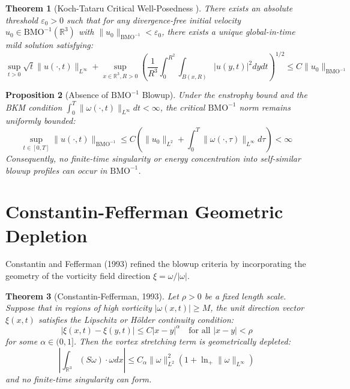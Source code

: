 \documentclass[11pt,a4paper]{article}
\newtheorem{theorem}{Theorem}[section]
\newtheorem{proposition}[theorem]{Proposition}
\theoremstyle{definition}
\begin{document}
\begin{theorem}[Koch-Tataru Critical Well-Posedness \cite{kochtataru2001}]
There exists an absolute threshold $\varepsilon_0 > 0$ such that for any divergence-free initial velocity $u_0 \in \mathrm{BMO}^{-1}(\mathbb{R}^3)$ with $\|u_0\|_{\mathrm{BMO}^{-1}} < \varepsilon_0$, there exists a unique global-in-time mild solution satisfying:
\begin{equation}
\sup_{t > 0} \sqrt{t} \|u(\cdot, t)\|_{L^\infty} + \sup_{x \in \mathbb{R}^3, R > 0} \left( \frac{1}{R^3} \int_0^{R^2} \int_{B(x, R)} |u(y, t)|^2 dy dt \right)^{1/2} \le C \|u_0\|_{\mathrm{BMO}^{-1}}
\end{equation}
\end{theorem}

\begin{proposition}[Absence of $\mathrm{BMO}^{-1}$ Blowup]
Under the enstrophy bound and the BKM condition $\int_0^T \|\omega(\cdot, t)\|_{L^\infty} dt < \infty$, the critical $\mathrm{BMO}^{-1}$ norm remains uniformly bounded:
\begin{equation}
\sup_{t \in [0, T]} \|u(\cdot, t)\|_{\mathrm{BMO}^{-1}} \le C \left( \|u_0\|_{L^2} + \int_0^T \|\omega(\cdot, \tau)\|_{L^\infty} d\tau \right) < \infty
\end{equation}
Consequently, no finite-time singularity or energy concentration into self-similar blowup profiles can occur in $\mathrm{BMO}^{-1}$.
\end{proposition}

\section{Constantin-Fefferman Geometric Depletion}
Constantin and Fefferman (1993) refined the blowup criteria by incorporating the geometry of the vorticity field direction $\xi = \omega / |\omega|$.

\begin{theorem}[Constantin-Fefferman, 1993]
Let $\rho > 0$ be a fixed length scale. Suppose that in regions of high vorticity $|\omega(x,t)| \ge M$, the unit direction vector $\xi(x,t)$ satisfies the Lipschitz or Hölder continuity condition:
\begin{equation}
|\xi(x,t) - \xi(y,t)| \le C |x-y|^\alpha \quad \text{for all } |x-y| < \rho
\end{equation}
for some $\alpha \in (0, 1]$. Then the vortex stretching term is geometrically depleted:
\begin{equation}
\left| \int_{\mathbb{R}^3} (S \omega) \cdot \omega dx \right| \le C_\alpha \|\omega\|_{L^2}^2 (1 + \ln_+ \|\omega\|_{L^\infty})
\end{equation}
and no finite-time singularity can form.
\end{theorem}
\end{document}
